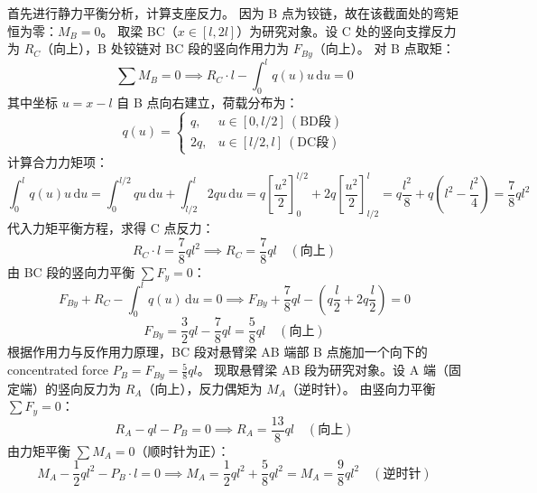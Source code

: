\documentclass[11pt,a4paper]{ctexrep}
\newcommand{\diff}{\,\mathrm{d}}
\begin{document}
{首先进行静力平衡分析，计算支座反力。
因为 B 点为铰链，故在该截面处的弯矩恒为零：$M_B = 0$。
取梁 BC（$x \in [l, 2l]$）为研究对象。设 C 处的竖向支撑反力为 $R_C$（向上），B 处铰链对 BC 段的竖向作用力为 $F_{By}$（向上）。
对 B 点取矩：
\[
    \sum M_B = 0 \implies R_C \cdot l - \int_{0}^{l} q(u) u \diff u = 0
\]
其中坐标 $u = x - l$ 自 B 点向右建立，荷载分布为：
\[
    q(u) = \begin{cases} q, & u \in [0, l/2] \ (\text{BD段}) \\ 2q, & u \in [l/2, l] \ (\text{DC段}) \end{cases}
\]
计算合力力矩项：
\[
    \int_{0}^{l} q(u) u \diff u = \int_{0}^{l/2} q u \diff u + \int_{l/2}^{l} 2q u \diff u
    = q \left[ \frac{u^2}{2} \right]_{0}^{l/2} + 2q \left[ \frac{u^2}{2} \right]_{l/2}^{l}
    = q \frac{l^2}{8} + q \left( l^2 - \frac{l^2}{4} \right) = \frac{7}{8} ql^2
\]
代入力矩平衡方程，求得 C 点反力：
\[
    R_C \cdot l = \frac{7}{8} ql^2 \implies R_C = \frac{7}{8} ql \quad (\text{向上})
\]
由 BC 段的竖向力平衡 $\sum F_y = 0$：
\[
    F_{By} + R_C - \int_{0}^{l} q(u) \diff u = 0 \implies F_{By} + \frac{7}{8} ql - \left( q \frac{l}{2} + 2q \frac{l}{2} \right) = 0
\]
\[
    F_{By} = \frac{3}{2} ql - \frac{7}{8} ql = \frac{5}{8} ql \quad (\text{向上})
\]
根据作用力与反作用力原理，BC 段对悬臂梁 AB 端部 B 点施加一个向下的 concentrated force $P_B = F_{By} = \frac{5}{8} ql$。
现取悬臂梁 AB 段为研究对象。设 A 端（固定端）的竖向反力为 $R_A$（向上），反力偶矩为 $M_A$（逆时针）。
由竖向力平衡 $\sum F_y = 0$：
\[
    R_A - ql - P_B = 0 \implies R_A = \frac{13}{8} ql \quad (\text{向上})
\]
由力矩平衡 $\sum M_A = 0$（顺时针为正）：
\[
    M_A - \frac{1}{2} ql^2 - P_B \cdot l = 0 \implies M_A = \frac{1}{2} ql^2 + \frac{5}{8} ql^2 = M_A = \frac{9}{8} ql^2 \quad (\text{逆时针})
\]

}
\end{document}
